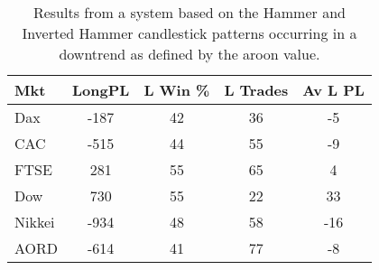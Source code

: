\begin{table}[ht]
\centering
\caption[Results from a system based on the Hammer and Inverted Hammer candlestick patterns occurring in a downtrend]{Results from a system based on the Hammer and Inverted Hammer candlestick patterns occurring in a downtrend as defined by the aroon value.} 
\label{tab:hammer_aroon_results}
\begin{tabular}{lcccc}
  \toprule Mkt & LongPL & L Win \% & L Trades & Av L PL \\ 
  \midrule Dax & -187 & 42 & 36 & -5 \\ 
  CAC & -515 & 44 & 55 & -9 \\ 
  FTSE & 281 & 55 & 65 & 4 \\ 
  Dow & 730 & 55 & 22 & 33 \\ 
  Nikkei & -934 & 48 & 58 & -16 \\ 
  AORD & -614 & 41 & 77 & -8 \\ 
   \bottomrule \end{tabular}
\end{table}
